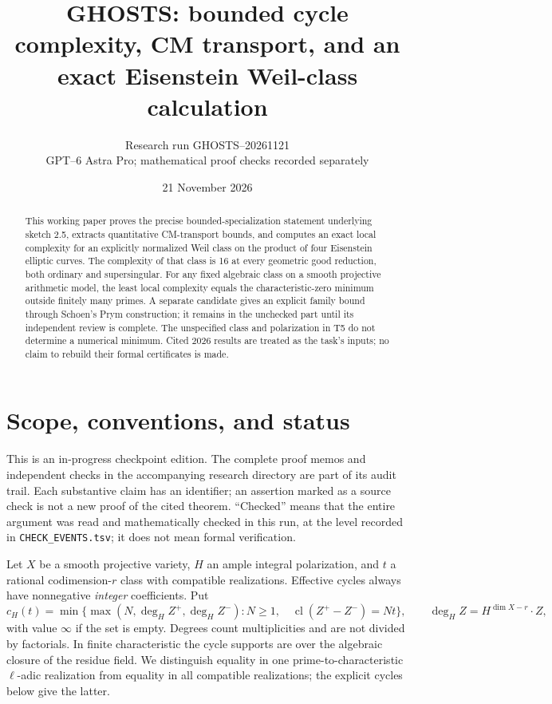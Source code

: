 \documentclass[11pt]{article}
\title{GHOSTS: bounded cycle complexity, CM transport, and an exact Eisenstein Weil-class calculation}
\author{Research run GHOSTS--20261121\\GPT--6 Astra Pro; mathematical proof checks recorded separately}
\date{21 November 2026}
\theoremstyle{remark}
\newcommand{\cl}{\operatorname{cl}}
\begin{document}
\maketitle
\begin{abstract}
This working paper proves the precise bounded-specialization statement underlying sketch 2.5, extracts quantitative CM-transport bounds, and computes an exact local complexity for an explicitly normalized Weil class on the product of four Eisenstein elliptic curves. The complexity of that class is 16 at every geometric good reduction, both ordinary and supersingular. For any fixed algebraic class on a smooth projective arithmetic model, the least local complexity equals the characteristic-zero minimum outside finitely many primes. A separate candidate gives an explicit family bound through Schoen's Prym construction; it remains in the unchecked part until its independent review is complete. The unspecified class and polarization in T5 do not determine a numerical minimum. Cited 2026 results are treated as the task's inputs; no claim to rebuild their formal certificates is made.
\end{abstract}
\tableofcontents
\section{Scope, conventions, and status}
This is an in-progress checkpoint edition. The complete proof memos and independent checks in the accompanying research directory are part of its audit trail. Each substantive claim has an identifier; an assertion marked as a source check is not a new proof of the cited theorem. ``Checked'' means that the entire argument was read and mathematically checked in this run, at the level recorded in \texttt{CHECK\_EVENTS.tsv}; it does not mean formal verification.

Let $X$ be a smooth projective variety, $H$ an ample integral polarization, and $t$ a rational codimension-$r$ class with compatible realizations. Effective cycles always have nonnegative \emph{integer} coefficients. Put
\[
c_H(t)=\min\{\max(N,\deg_H Z^+,\deg_H Z^-):N\geq1,\quad
\cl(Z^+-Z^-)=Nt\},\qquad \deg_H Z=H^{\dim X-r}\cdot Z,
\]
with value $\infty$ if the set is empty. Degrees count multiplicities and are not divided by factorials. In finite characteristic the cycle supports are over the algebraic closure of the residue field. We distinguish equality in one prime-to-characteristic $\ell$-adic realization from equality in all compatible realizations; the explicit cycles below give the latter.
\end{document}
